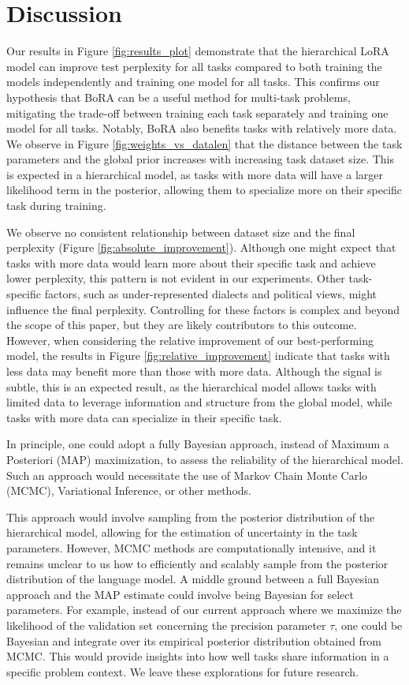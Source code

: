 \documentclass[fullpaper]{nldl}
\begin{document}
\section{Discussion} \label{sec:discussion}
Our results in Figure \ref{fig:results_plot} demonstrate that the hierarchical LoRA model can improve test perplexity for all tasks compared to both training the models independently and training one model for all tasks. This confirms our hypothesis that BoRA can be a useful method for multi-task problems, mitigating the trade-off between training each task separately and training one model for all tasks. Notably, BoRA also benefits tasks with relatively more data.
We observe in Figure \ref{fig:weights_vs_datalen} that the distance between the task parameters and the global prior increases with increasing task dataset size. This is expected in a hierarchical model, as tasks with more data will have a larger likelihood term in the posterior, allowing them to specialize more on their specific task during training.

We observe no consistent relationship between dataset size and the final perplexity (Figure \ref{fig:absolute_improvement}). Although one might expect that tasks with more data would learn more about their specific task and achieve lower perplexity, this pattern is not evident in our experiments. Other task-specific factors, such as under-represented dialects and political views, might influence the final perplexity. Controlling for these factors is complex and beyond the scope of this paper, but they are likely contributors to this outcome.
However, when considering the relative improvement of our best-performing model, the results in Figure \ref{fig:relative_improvement} indicate that tasks with less data may benefit more than those with more data. Although the signal is subtle, this is an expected result, as the hierarchical model allows tasks with limited data to leverage information and structure from the global model, while tasks with more data can specialize in their specific task.

In principle, one could adopt a fully Bayesian approach, instead of Maximum a Posteriori (MAP) maximization, to assess the reliability of the hierarchical model. Such an approach would necessitate the use of Markov Chain Monte Carlo (MCMC), Variational Inference, or other methods.

This approach would involve sampling from the posterior distribution of the hierarchical model, allowing for the estimation of uncertainty in the task parameters. However, MCMC methods are computationally intensive, and it remains unclear to us how to efficiently and scalably sample from the posterior distribution of the language model.
A middle ground between a full Bayesian approach and the MAP estimate could involve being Bayesian for select parameters. For example, instead of our current approach where we maximize the likelihood of the validation set concerning the precision parameter $\tau$, one could be Bayesian and integrate over its empirical posterior distribution obtained from MCMC. This would provide insights into how well tasks share information in a specific problem context.
We leave these explorations for future research.
\end{document}
